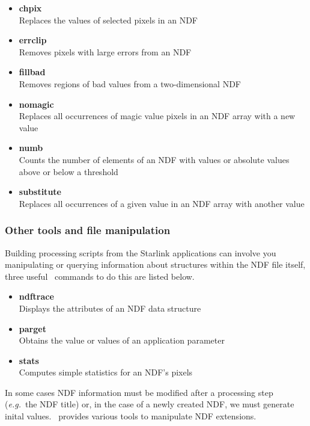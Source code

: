 \documentclass[twoside,11pt]{article}
\newcommand{\htmlref}[2]{#1}
\newcommand{\xref}[3]{#1}
\begin{document}
{\begin{itemize}
\item{\xref{{\bf chpix}}{sun95}{CHPIX}}\\ 
Replaces the values of selected pixels in an NDF 
\item{\xref{{\bf errclip}}{sun95}{ERRCLIP}}\\ 
Removes pixels with large errors from an NDF 
\item{\xref{{\bf fillbad}}{sun95}{FILLBAD}}\\ 
Removes regions of bad values from a two-dimensional NDF 
\item{\xref{{\bf nomagic}}{sun95}{NOMAGIC}}\\ 
Replaces all occurrences of \xref{magic value}{sun95}{se_masking} 
pixels in an NDF array with a new value 
\item{\xref{{\bf numb}}{sun95}{NUMB}}\\ 
Counts the number of elements of an NDF with values or absolute values above or below a threshold 
\item{\xref{{\bf substitute}}{sun95}{SUBSTITUTE}}\\
Replaces all occurrences of a given value in an NDF array with another value 
\end{itemize}

\subsubsection{Other tools and file manipulation}

Building processing scripts from the Starlink applications can involve
you manipulating or querying information about structures within the
NDF file itself, three useful \KAPPAref\ commands to do this are listed
below.

\begin{itemize}
\item{\xref{{\bf ndftrace}}{sun95}{NDFTRACE}}\\
Displays the attributes of an NDF data structure 
\item{\xref{{\bf parget}}{sun95}{PARGET}}\\
Obtains the value or values of an application parameter 
\item{\xref{{\bf stats}}{sun95}{STATS}}\\
Computes simple statistics for an NDF's pixels  
\end{itemize}  

In some cases NDF information must be modified after a processing step
(\emph{e.g.}\ the NDF title) or, in the case of a \htmlref{newly
created}{sc16_newndf} NDF,
we must generate inital values.  \KAPPA\ provides various tools to
manipulate NDF extensions.

}
\end{document}
